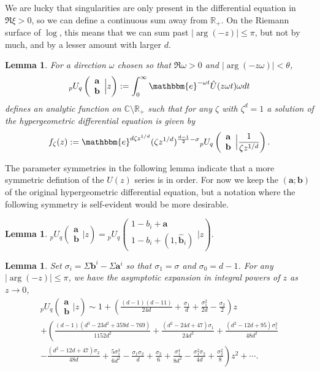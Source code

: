 \documentclass[12pt]{article}
\newcommand{\ee}[0] {\mathbbm{e}}
\numberwithin{equation}{section}
\newtheorem{lemma}[theorem]{Lemma}
\newcommand{\FF}[6] {{}_{#1}{#2}_{#3} \left( \begin{array}{c} #4 \\ #5 \end{array} \Big| {#6}  \right)}
\newcommand{\bfa}[0] {\mathbf{a}}
\newcommand{\bfb}[0] {\mathbf{b}}
\begin{document}
We are lucky that singularities are only present in the differential equation in $\Re \xi > 0$, so we can define a continuous sum away from $\mathbb{R}_{+}$. On the Riemann surface of $\log$, this means that we can sum past $|\arg(-z)|\le \pi$, but not by much, and by a lesser amount with larger $d$.

\begin{lemma}
\label{pUq_def}
For a direction $\omega$ chosen so that $\Re \omega > 0$ and $|\arg(-z \omega)| < \theta$,
\begin{equation*}
\FF{p}{U}{q}{\bfa}{\bfb}{z} := \int_{0}^{\infty} \ee^{-\omega t} \hat{U}(z \omega t) \omega dt
\end{equation*}
defines an analytic function on $\mathbb{C} \setminus \mathbb{R}_{+}$ such that for any $\zeta$ with $\zeta^d=1$ a solution of the hypergeometric differential equation is given by
\begin{equation*}
f_{\zeta}(z) := \ee^{d \zeta z^{1/d}} (\zeta z^{1/d})^{\frac{d-1}{2}-\sigma} \FF{p}{U}{q}{\bfa}{\bfb}{\frac{1}{\zeta z^{1/d}}}\text{.}
\end{equation*}
\end{lemma}
The parameter symmetries in the following lemma indicate that a more symmetric defintion of the $U(z)$ series is in order. For now we keep the $(\bfa ; \bfb)$ of the original hypergeometric differential equation, but a notation where the following symmetry is self-evident would be more desirable.
\begin{lemma}
\label{lemma_pUq_inv} $\FF{p}{U}{q}{\bfa}{\bfb}{z} = \FF{p}{U}{q}{1-b_i+\bfa}{1-b_i+(1,\hat{\bfb}_{i})}{z}$.
\end{lemma}

\begin{lemma}
Set $\sigma_i = \Sigma\bfb^i-\Sigma\bfa^i$ so that $\sigma_1 = \sigma$ and $\sigma_0 = d-1$. For any $|\arg(-z)| \le \pi$, we have the asymptotic expansion in integral powers of $z$ as $z \to 0$,
\begin{gather*}
\FF{p}{U}{q}{\bfa}{\bfb}{z} \sim 1+ \left(\frac{(d-1)(d-11)}{24 d}+\frac{\sigma _1}{d}+\frac{\sigma _1^2}{2
   d}-\frac{\sigma
   _2}{2}\right)z\\
+\left(\frac{(d-1)\left(d^3-23 d^2+359 d-769\right)}{1152 d^2} +\frac{\left(d^2-24 d+47\right) \sigma _1}{24d^2} + \frac{\left(d^2-12 d+95\right) \sigma _1^2}{48d^2} \right.\\
\left. -\frac{\left(d^2-12 d+47\right) \sigma_2}{48 d}+\frac{5\sigma_1^3}{6d^2}-\frac{\sigma_1 \sigma_2}{d}+\frac{\sigma_3}{6}+ \frac{\sigma _1^4}{8 d^2}-\frac{\sigma_1^2 \sigma _2}{4d}+\frac{\sigma
   _2^2}{8}\right)z^2+\cdots\text{.}
\end{gather*}
\end{lemma}
\end{document}
